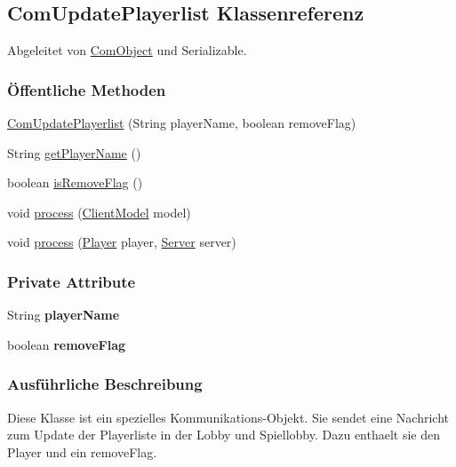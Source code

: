 \hypertarget{a00041}{\subsection{Com\-Update\-Playerlist Klassenreferenz}
\label{a00041}
}


Abgeleitet von \hyperlink{a00037}{Com\-Object} und Serializable.

\subsubsection*{Öffentliche Methoden}
\begin{DoxyCompactItemize}
\item 
\hyperlink{a00041_a3b55cecd3dda26d304f7b3d46be76afe}{Com\-Update\-Playerlist} (String player\-Name, boolean remove\-Flag)
\item 
String \hyperlink{a00041_a8cd2886758be9855ae14404540d4873d}{get\-Player\-Name} ()
\item 
boolean \hyperlink{a00041_a9dff5523222ad77b87dac521beceadd3}{is\-Remove\-Flag} ()
\item 
void \hyperlink{a00041_a758d7005755a181717f238f714d87dd2}{process} (\hyperlink{a00003}{Client\-Model} model)
\item 
void \hyperlink{a00041_ac67b5ce3ec03d48ef1e6caad6e49c902}{process} (\hyperlink{a00076}{Player} player, \hyperlink{a00077}{Server} server)
\end{DoxyCompactItemize}
\subsubsection*{Private Attribute}
\begin{DoxyCompactItemize}
\item 
\hypertarget{a00041_a12adf3f64463f614eb3af6dd82414e0a}{String {\bfseries player\-Name}}\label{a00041_a12adf3f64463f614eb3af6dd82414e0a}

\item 
\hypertarget{a00041_a6a8036d75616cc037b0cf641819947e9}{boolean {\bfseries remove\-Flag}}\label{a00041_a6a8036d75616cc037b0cf641819947e9}

\end{DoxyCompactItemize}


\subsubsection{Ausführliche Beschreibung}
Diese Klasse ist ein spezielles Kommunikations-\/\-Objekt. Sie sendet eine Nachricht zum Update der Playerliste in der Lobby und Spiellobby. Dazu enthaelt sie den Player und ein remove\-Flag. 

